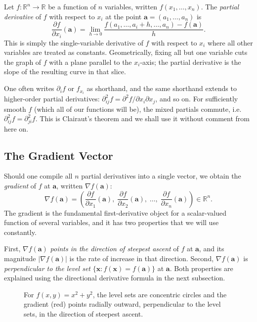\documentclass{article}
\begin{document}
Let $f: \mathbb{R}^n \to \mathbb{R}$ be a function of $n$ variables, written $f(x_1, \ldots, x_n)$. The \textit{partial derivative} of $f$ with respect to $x_i$ at the point $\mathbf{a} = (a_1, \ldots, a_n)$ is
$$\frac{\partial f}{\partial x_i}(\mathbf{a}) = \lim_{h \to 0} \frac{f(a_1, \ldots, a_i + h, \ldots, a_n) - f(\mathbf{a})}{h}.$$
This is simply the single-variable derivative of $f$ with respect to $x_i$ where all other variables are treated as constants. Geometrically, fixing all but one variable cuts the graph of $f$ with a plane parallel to the $x_i$-axis; the partial derivative is the slope of the resulting curve in that slice.

One often writes $\partial_i f$ or $f_{x_i}$ as shorthand, and the same shorthand extends to higher-order partial derivatives: $\partial_{ij}^2 f = \partial^2 f / \partial x_i \partial x_j$, and so on. For sufficiently smooth $f$ (which all of our functions will be), the mixed partials commute, i.e. $\partial_{ij}^2 f = \partial_{ji}^2 f$. This is Clairaut's theorem and we shall use it without comment from here on.

\subsection{The Gradient Vector}

Should one compile all $n$ partial derivatives into a single vector, we obtain the \textit{gradient} of $f$ at $\mathbf{a}$, written $\nabla f(\mathbf{a})$:
$$\nabla f(\mathbf{a}) = \left( \frac{\partial f}{\partial x_1}(\mathbf{a}),\; \frac{\partial f}{\partial x_2}(\mathbf{a}),\; \ldots,\; \frac{\partial f}{\partial x_n}(\mathbf{a}) \right) \in \mathbb{R}^n.$$
The gradient is the fundamental first-derivative object for a scalar-valued function of several variables, and it has two properties that we will use constantly.

First, $\nabla f(\mathbf{a})$ \textit{points in the direction of steepest ascent} of $f$ at $\mathbf{a}$, and its magnitude $|\nabla f(\mathbf{a})|$ is the rate of increase in that direction. Second, $\nabla f(\mathbf{a})$ is \textit{perpendicular to the level set} $\{\mathbf{x} : f(\mathbf{x}) = f(\mathbf{a})\}$ at $\mathbf{a}$. Both properties are explained using the directional derivative formula in the next subsection.

\begin{figure}[H]
\centering
{}
\caption{For $f(x,y) = x^2 + y^2$, the level sets are concentric circles and the gradient (red) points radially outward, perpendicular to the level sets, in the direction of steepest ascent.}
\label{fig:gradient}
\end{figure}
\end{document}
